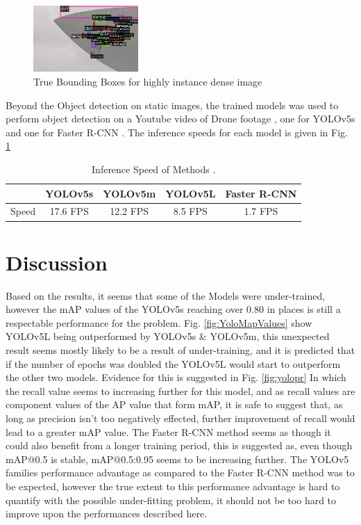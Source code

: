 \documentclass[conference]{IEEEtran}
\begin{document}
\begin{figure}[H]
    \centering
    \includegraphics[width=4cm]{Images/True.jpg}
    \caption{True Bounding Boxes for highly instance dense image}
    \label{fig:DenseTruth}
\end{figure}

Beyond the Object detection on static images, the trained models was used to perform object detection on a Youtube video of Drone footage \cite{OriginalVid}, one for YOLOv5s \cite{YOLOv5svid} and one for Faster R-CNN \cite{FasterRCNNvid}. The inference speeds for each model is given in Fig. \ref{tab:infspeed}

\begin{table}[H]
\begin{center}
\begin{tabular}{ |c|c|c|c|c| }
\hline
  & YOLOv5s & YOLOv5m & YOLOv5L & Faster R-CNN  \\ 
 \hline
 Speed & 17.6 FPS & 12.2 FPS & 8.5 FPS & 1.7 FPS  \\
  \hline
\end{tabular}
\vspace*{3mm}
\caption{\label{tab:infspeed}Inference Speed of Methods
.}
\end{center}
\end{table}

\section{Discussion}
Based on the results, it seems that some of the Models were under-trained, however the mAP values of the YOLOv5s reaching over 0.80 in places is still a respectable performance for the problem. Fig. \ref{fig:YoloMapValues} show YOLOv5L being outperformed by YOLOv5s \& YOLOv5m, this unexpected result seems mostly likely to be a result of under-training, and it is predicted that if the number of epochs was doubled the YOLOv5L would start to outperform the other two models. Evidence for this is suggested in Fig. \ref{fig:yolopr} In which the recall value seems to increasing further for this model, and as recall values are component values of the AP value that form mAP, it is safe to suggest that, as long as precision isn't too negatively effected, further improvement of recall would lead to a greater mAP value. The Faster R-CNN method seems as though it could also benefit from a longer training period, this is suggested as, even though mAP@0.5 is stable, mAP@0.5:0.95 seems to be increasing further. The YOLOv5 families performance advantage as compared to the Faster R-CNN method was to be expected, however the true extent to this performance advantage is hard to quantify with the possible under-fitting problem, it should not be too hard to improve upon the performances described here. 
\end{document}
